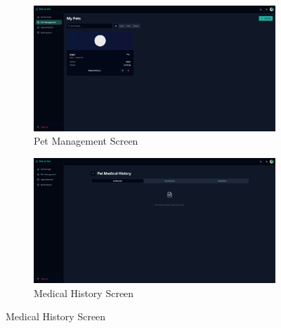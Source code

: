\documentclass[12pt,a4paper,twoside]{book}
\begin{document}
\begin{figure}[H]
  \centering
    \begin{subfigure}[b]{0.48\textwidth}
      \centering
      \includegraphics[width=\textwidth,height=0.4\textheight,keepaspectratio]{Resources/Final UI/pet-management.png}
      \caption{Pet Management Screen}\label{fig:pet-management-screen}
    \end{subfigure}
    \hfill
    \begin{subfigure}[b]{0.48\textwidth}
      \centering
      \includegraphics[width=\textwidth,height=0.4\textheight,keepaspectratio]{Resources/Final UI/medical-history.png}
      \caption{Medical History Screen}\label{fig:medical-history-screen}
    \end{subfigure}
\end{figure}
\end{document}
